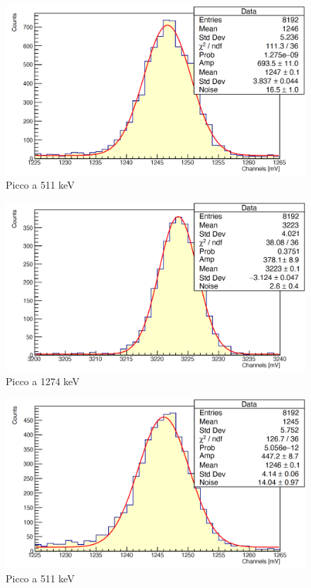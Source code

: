 \documentclass[a4paper,10pt]{article}
\begin{document}
\begin{figure}[H]
    \centering
    \includegraphics[scale=0.45]{appendice/spettri/NaA1_16}
    \caption{Picco a 511 keV}
\end{figure}
\begin{figure}[H]
    \centering
    \includegraphics[scale=0.45]{appendice/spettri/NaA2_16}
    \caption{Picco a 1274 keV}
\end{figure}
\begin{figure}[H]
    \centering
    \includegraphics[scale=0.45]{appendice/spettri/NaA1_20}
    \caption{Picco a 511 keV}
\end{figure}
\end{document}
